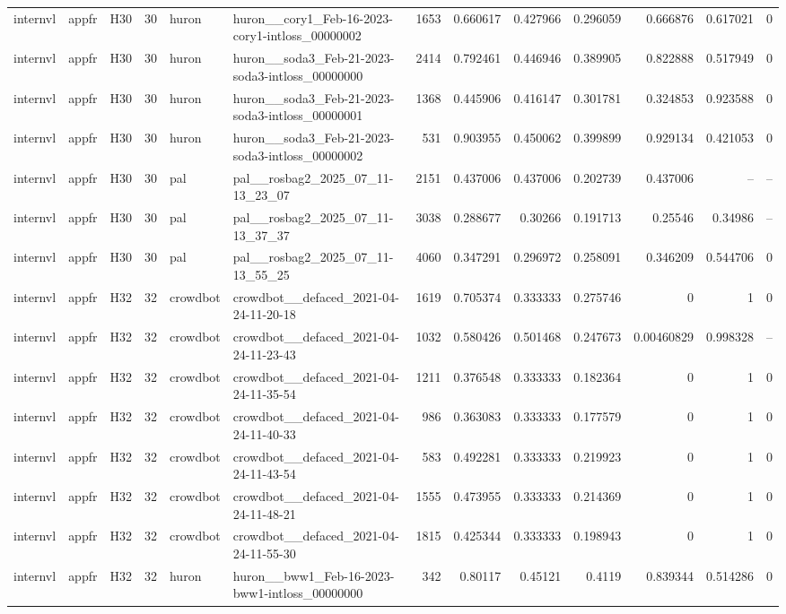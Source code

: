 \begin{longtable}{lllrllrrrrrrr}
internvl & appfr & H30 & 30 & huron & huron\_\_cory1\_Feb-16-2023-cory1-intloss\_00000002 & 1653 & 0.660617 & 0.427966 & 0.296059 & 0.666876 & 0.617021 & 0 \\
internvl & appfr & H30 & 30 & huron & huron\_\_soda3\_Feb-21-2023-soda3-intloss\_00000000 & 2414 & 0.792461 & 0.446946 & 0.389905 & 0.822888 & 0.517949 & 0 \\
internvl & appfr & H30 & 30 & huron & huron\_\_soda3\_Feb-21-2023-soda3-intloss\_00000001 & 1368 & 0.445906 & 0.416147 & 0.301781 & 0.324853 & 0.923588 & 0 \\
internvl & appfr & H30 & 30 & huron & huron\_\_soda3\_Feb-21-2023-soda3-intloss\_00000002 & 531 & 0.903955 & 0.450062 & 0.399899 & 0.929134 & 0.421053 & 0 \\
internvl & appfr & H30 & 30 & pal & pal\_\_rosbag2\_2025\_07\_11-13\_23\_07 & 2151 & 0.437006 & 0.437006 & 0.202739 & 0.437006 & -- & -- \\
internvl & appfr & H30 & 30 & pal & pal\_\_rosbag2\_2025\_07\_11-13\_37\_37 & 3038 & 0.288677 & 0.30266 & 0.191713 & 0.25546 & 0.34986 & -- \\
internvl & appfr & H30 & 30 & pal & pal\_\_rosbag2\_2025\_07\_11-13\_55\_25 & 4060 & 0.347291 & 0.296972 & 0.258091 & 0.346209 & 0.544706 & 0 \\
internvl & appfr & H32 & 32 & crowdbot & crowdbot\_\_defaced\_2021-04-24-11-20-18 & 1619 & 0.705374 & 0.333333 & 0.275746 & 0 & 1 & 0 \\
internvl & appfr & H32 & 32 & crowdbot & crowdbot\_\_defaced\_2021-04-24-11-23-43 & 1032 & 0.580426 & 0.501468 & 0.247673 & 0.00460829 & 0.998328 & -- \\
internvl & appfr & H32 & 32 & crowdbot & crowdbot\_\_defaced\_2021-04-24-11-35-54 & 1211 & 0.376548 & 0.333333 & 0.182364 & 0 & 1 & 0 \\
internvl & appfr & H32 & 32 & crowdbot & crowdbot\_\_defaced\_2021-04-24-11-40-33 & 986 & 0.363083 & 0.333333 & 0.177579 & 0 & 1 & 0 \\
internvl & appfr & H32 & 32 & crowdbot & crowdbot\_\_defaced\_2021-04-24-11-43-54 & 583 & 0.492281 & 0.333333 & 0.219923 & 0 & 1 & 0 \\
internvl & appfr & H32 & 32 & crowdbot & crowdbot\_\_defaced\_2021-04-24-11-48-21 & 1555 & 0.473955 & 0.333333 & 0.214369 & 0 & 1 & 0 \\
internvl & appfr & H32 & 32 & crowdbot & crowdbot\_\_defaced\_2021-04-24-11-55-30 & 1815 & 0.425344 & 0.333333 & 0.198943 & 0 & 1 & 0 \\
internvl & appfr & H32 & 32 & huron & huron\_\_bww1\_Feb-16-2023-bww1-intloss\_00000000 & 342 & 0.80117 & 0.45121 & 0.4119 & 0.839344 & 0.514286 & 0 \\

\end{longtable}
